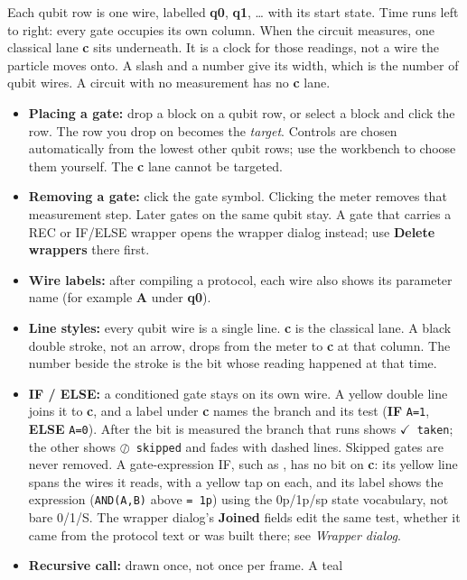 Each qubit row is one wire, labelled \textbf{q0}, \textbf{q1}, \ldots{} with
its start state. Time runs left to right: every gate occupies its own column.
When the circuit measures, one classical lane \textbf{c} sits underneath.
It is a clock for those readings, not a wire the particle moves onto. A slash
and a number give its width, which is the number of qubit wires. A circuit
with no measurement has no \textbf{c} lane.
\begin{itemize}
  \item \textbf{Placing a gate:} drop a block on a qubit row, or select a
  block and click the row. The row you drop on becomes the \emph{target}.
  Controls are chosen automatically from the lowest other qubit rows; use the
  workbench to choose them yourself. The \textbf{c} lane cannot be targeted.
  \item \textbf{Removing a gate:} click the gate symbol. Clicking the meter
  removes that measurement step. Later gates on the same qubit stay. A gate
  that carries a REC or IF/ELSE wrapper opens the wrapper dialog instead;
  use \textbf{Delete wrappers} there first.
  \item \textbf{Wire labels:} after compiling a protocol, each wire also
  shows its parameter name (for example \textbf{A} under \textbf{q0}).
  \item \textbf{Line styles:} every qubit wire is a single line.
  \textbf{c} is the classical lane. A black double stroke, not an arrow,
  drops from the meter to \textbf{c} at that column. The number beside the
  stroke is the bit whose reading happened at that time.
  \item \textbf{IF / ELSE:} a conditioned gate stays on its own wire. A yellow
  double line joins it to \textbf{c}, and a label under \textbf{c} names the
  branch and its test (\textbf{IF} \texttt{A=1}, \textbf{ELSE}
  \texttt{A=0}). After the bit is measured the branch that runs shows
  \texttt{$\checkmark$ taken}; the other shows \texttt{$\oslash$ skipped}
  and fades with dashed lines. Skipped gates are never removed. A
  gate-expression IF, such as , has no bit
  on \textbf{c}: its yellow line spans the wires it reads, with a yellow tap
  on each, and its label shows the expression (\texttt{AND(A,B)} above
  \texttt{= 1p}) using the 0p/1p/sp state vocabulary, not bare 0/1/S. The
  wrapper dialog's \textbf{Joined} fields edit the same test, whether it came
  from the protocol text or was built there; see \emph{Wrapper dialog}.
  \item \textbf{Recursive call:} drawn once, not once per frame. A teal

\end{itemize}
